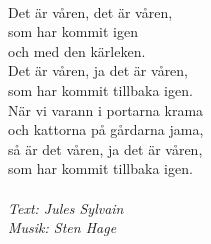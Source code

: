 \vspace{10pt}\\
Det är våren, det är våren,\\
som har kommit igen\\
och med den kärleken.\\
Det är våren, ja det är våren,\\
som har kommit tillbaka igen.\\
När vi varann i portarna krama\\
och kattorna på gårdarna jama,\\
så är det våren, ja det är våren,\\
som har kommit tillbaka igen.\\
\\
{\footnotesize\textit{Text: Jules Sylvain\\ Musik: Sten Hage}}
